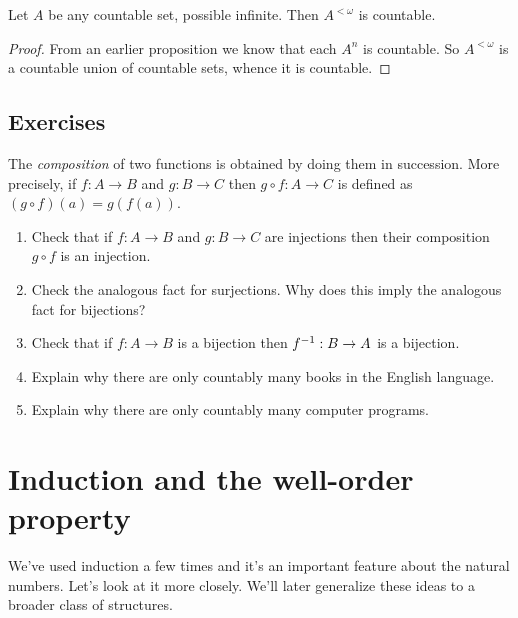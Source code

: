 \documentclass[10pt]{amsart}
\begin{document}
\begin{corollary}
Let $A$ be any countable set, possible infinite. Then $A^{<\omega}$ is countable.
\end{corollary}

\begin{proof}
From an earlier proposition we know that each $A^n$ is countable. So $A^{<\omega}$ is a countable union of countable sets, whence it is countable.
\end{proof}



\subsection*{Exercises}

The \emph{composition} of two functions is obtained by doing them in succession. More precisely, if $f : A \to B$ and $g : B \to C$ then $g \circ f : A \to C$ is defined as $(g \circ f)(a) = g(f(a))$.

\begin{enumerate}
\item Check that if $f : A \to B$ and $g : B \to C$ are injections then their composition $g \circ f$ is an injection.
\item Check the analogous fact for surjections. Why does this imply the analogous fact for bijections?
\item Check that if $f : A \to B$ is a bijection then $f^{-1} : B \to A$ is a bijection.

\item Explain why there are only countably many books in the English language.
\item Explain why there are only countably many computer programs.
\end{enumerate}



\newpage

\section{Induction and the well-order property}

We've used induction a few times and it's an important feature about the natural numbers. Let's look at it more closely. We'll later generalize these ideas to a broader class of structures.
\end{document}

